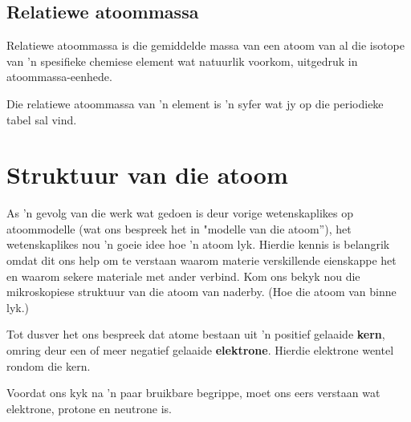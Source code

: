             \subsection*{Relatiewe atoommassa}
            \nopagebreak
            \par

 {Relatiewe atoommassa is die gemiddelde massa van een atoom van al die isotope van   'n spesifieke chemiese element wat natuurlik voorkom, uitgedruk in atoommassa-eenhede.} 


Die relatiewe atoommassa van  'n element is  'n syfer wat jy op die periodieke tabel sal vind. \par 
  


\section{Struktuur van die atoom}
\nopagebreak
\label{m38745*id255206}
As  'n gevolg van die werk wat gedoen is deur vorige wetenskaplikes op atoommodelle (wat ons bespreek het in "modelle van die atoom”), het wetenskaplikes nou  'n goeie idee hoe  'n atoom lyk. Hierdie kennis is belangrik omdat dit ons help om te verstaan ​waarom materie verskillende eienskappe het en waarom sekere materiale met ander verbind. Kom ons bekyk nou die mikroskopiese struktuur van die atoom van naderby. (Hoe die atoom van binne lyk.) \par 


Tot dusver het ons bespreek dat atome bestaan uit 'n positief gelaaide \textbf{kern}, omring deur een of meer negatief gelaaide \textbf{elektrone}. Hierdie elektrone wentel rondom die kern. \par 
      
Voordat ons kyk na  'n paar bruikbare begrippe, moet ons eers verstaan wat elektrone, protone en neutrone is.\par
 
